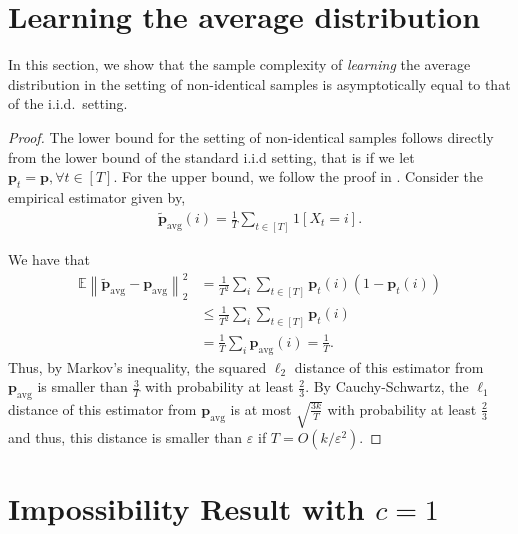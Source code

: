 \documentclass[10pt]{article} %
\def\eps{{\varepsilon}}
\newcommand{\E}{\mathbb{E}}
\theoremstyle{plain}
\newcommand{\bp}{\textbf{p}}
\newcommand{\avg}{\mathrm{avg}}
\begin{document}



\appendix
\section{Learning the average distribution}
\label{sec:learning}

In this section, we show that the sample complexity of \textit{learning} the average distribution in the setting of non-identical samples is asymptotically equal to that of the i.i.d.\ setting.
\claimlearning*
\begin{proof}
	The lower bound for the setting of non-identical samples follows directly from the lower bound of the standard i.i.d setting, that is if we let $\bp_t=\bp, \forall t \in [T]$. For the upper bound, we follow the proof in \citep[Theorem 1]{canonne2020short}. Consider the empirical estimator given by,
	\begin{align*}
		\tilde{\bp}_{\avg}(i) = \frac{1}{T}\sum_{t \in [T]} 1[X_t = i].
	\end{align*}
	
	We have that
	\begin{align*}
		\E\left\|\tilde{\bp}_{\avg}-{\bp}_{\avg}\right\|^2_2 &= \frac{1}{T^2}\sum_{i}\sum_{t \in [T]} {\bp}_{t}(i)(1-{\bp}_{t}(i)) \\
		&\le \frac{1}{T^2}\sum_{i}\sum_{t \in [T]} {\bp}_{t}(i) \\
		&=\frac{1}{T}\sum_{i} {\bp}_{\avg}(i) = \frac{1}{T}.
	\end{align*}
	Thus, by Markov's inequality, the squared $\ell_2$ distance of this estimator from $\bp_{\avg}$ is smaller than $\frac{3}{T}$ with probability at least $\frac23$. By Cauchy-Schwartz, the $\ell_1$ distance of this estimator from $\bp_{\avg}$ is at most 
	$\sqrt{\frac{3k}{T}}$ with probability at least $\frac23$ and thus, this distance is smaller than $\eps$ if $T=O(k/\eps^2)$.
	
	\end{proof}
\section{Impossibility Result with \texorpdfstring{$c=1$}{c}}
\label{sec:impossibility_cone_proof}

\thmcone*
\end{document}
